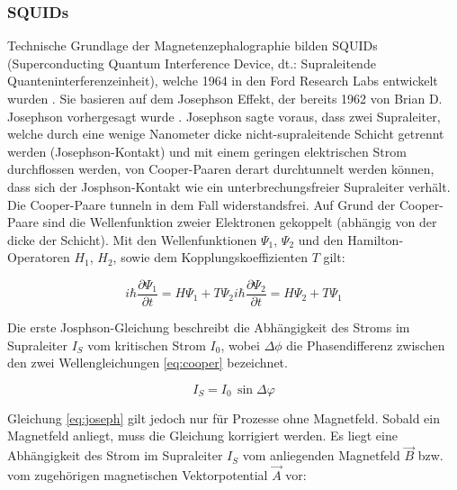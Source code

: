 \documentclass[doc,a4paper,12pt]{apa6}
\begin{document}
\subsubsection{SQUIDs}
\label{sec:squids}

Technische Grundlage der Magnetenzephalographie bilden SQUIDs (Superconducting Quantum Interference Device, dt.: Supraleitende Quanteninterferenzeinheit), welche 1964 in den Ford Research Labs entwickelt wurden \parencite{jaklevic1964quantum}. Sie basieren auf dem Josephson Effekt, der bereits 1962 von Brian D. Josephson vorhergesagt wurde \parencite{josephson1962possible}. Josephson sagte voraus, dass zwei Supraleiter, welche durch eine wenige Nanometer dicke nicht-supraleitende Schicht getrennt werden (Josephson-Kontakt) und mit einem geringen elektrischen Strom durchflossen werden, von Cooper-Paaren derart durchtunnelt werden können, dass sich der Josphson-Kontakt wie ein unterbrechungsfreier Supraleiter verhält. Die Cooper-Paare tunneln in dem Fall widerstandsfrei.
Auf Grund der Cooper-Paare sind die Wellenfunktion zweier Elektronen gekoppelt (abhängig von der dicke der Schicht). Mit den Wellenfunktionen $\Psi_1$, $\Psi_2$ und den Hamilton-Operatoren $H_1$, $H_2$, sowie dem Kopplungskoeffizienten $T$ gilt:

\begin{subequations}
\label{eq:cooper}
  \begin{equation} i\hbar \frac{\partial \Psi_1}{\partial t} = H \Psi_1 + T \Psi_2 \end{equation}
   \begin{equation} i\hbar \frac{\partial \Psi_2}{\partial t} = H \Psi_2 + T \Psi_1 \end{equation}
\end{subequations}

Die erste Josphson-Gleichung beschreibt die Abhängigkeit des Stroms im Supraleiter $I_S$ vom kritischen Strom $I_0$, wobei $\Delta \phi$ die Phasendifferenz zwischen den zwei Wellengleichungen \ref{eq:cooper} bezeichnet.

\begin{equation}
\label{eq:joseph}
I_S = I_0\,\sin{\Delta \varphi}
\end{equation}

Gleichung \ref{eq:joseph} gilt jedoch nur für Prozesse ohne Magnetfeld. Sobald ein Magnetfeld anliegt, muss die Gleichung korrigiert werden. Es liegt eine Abhängigkeit des Strom im Supraleiter $I_S$ vom anliegenden Magnetfeld $\vec{B}$ bzw. vom zugehörigen magnetischen Vektorpotential $\vec{A}$ vor:
\end{document}
